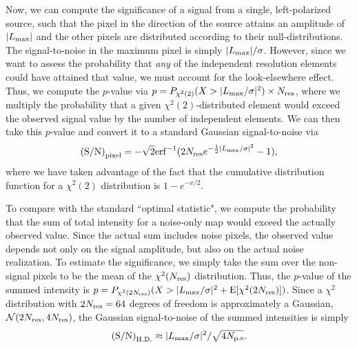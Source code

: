 \documentclass[%
 reprint,
nofootinbib,
 amsmath,amssymb,
 aps,
]{revtex4-2}
\begin{document}
Now, we can compute the significance of a signal from a single, left-polarized source, such that the pixel in the direction of the source attains an amplitude of $|L_{\rm max}|$ and the other pixels are distributed according to their null-distributions. The signal-to-noise in the maximum pixel is simply $|L_{\rm max}| / \sigma$. However, since we want to assess the probability that \textit{any} of the independent resolution elements could have attained that value, we must account for the look-elsewhere effect. Thus, we compute the $p$-value via $p = P_{\chi^2(2)} (X > |L_{\rm max} / \sigma|^2) \times N_{\rm res}$, where we multiply the probability that a given $\chi^2(2)$-distributed element would exceed the observed signal value by the number of independent elements. We can then take this $p$-value and convert it to a standard Gaussian signal-to-noise via
\begin{equation}
    \mathrm{(S/N)}_{\rm pixel} = - \sqrt{2} {\rm erf}^{-1}( 2 N_{\rm res} e^{-\frac{1}{2}|L_{\rm max} / \sigma|^2} - 1),
\end{equation}
where we have taken advantage of the fact that the cumulative distribution function for a $\chi^2(2)$ distribution is $1 - e^{-x/2}$.

To compare with the standard ``optimal statistic", we compute the probability that the sum of total intensity for a noise-only map would exceed the actually observed value. Since the actual sum includes noise pixels, the observed value depends not only on the signal amplitude, but also on the actual noise realization. To estimate the significance, we simply take the sum over the non-signal pixels to be the mean of the $\chi^2(N_{\rm res})$ distribution. Thus, the $p$-value of the summed intensity is $p = P_{\chi^2(2N_{\rm res})}(X > |L_{\rm max}/\sigma|^2 + {\rm E}[\chi^2(2 N_{\rm res})])$. Since a $\chi^2$ distribution with $2 N_{\rm res} = 64$ degrees of freedom is approximately a Gaussian, $\mathcal{N}(2 N_{\rm res}, 4 N_{\rm res})$, the Gaussian signal-to-noise of the summed intensities is simply
\begin{equation}
    \mathrm{(S/N)}_{\rm H.D.} \approx |L_{\rm max} / \sigma|^2 / \sqrt{4 N_{\rm p.s}}.
\end{equation}
\end{document}
